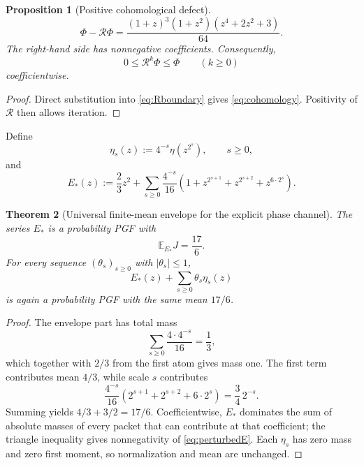 \documentclass[11pt,a4paper]{article}
\newtheorem{theorem}{Theorem}[section]
\newtheorem{proposition}[theorem]{Proposition}
\theoremstyle{definition}
\theoremstyle{remark}
\newcommand{\E}{\mathbb E}
\newcommand{\cR}{\mathcal R}
\begin{document}
\begin{proposition}[Positive cohomological defect]
\begin{equation}
 \boxed{
 \Phi-\cR\Phi
 =\frac{(1+z)^3(1+z^2)(z^4+2z^2+3)}{64}.
 }
 \label{eq:cohomology}
\end{equation}
The right-hand side has nonnegative coefficients.  Consequently,
\begin{equation}
 0\le\cR^k\Phi\le\Phi
 \qquad(k\ge0)
 \label{eq:Rbound}
\end{equation}
coefficientwise.
\end{proposition}

\begin{proof}
Direct substitution into \eqref{eq:Rboundary} gives
\eqref{eq:cohomology}.  Positivity of \(\cR\) then allows iteration.
\end{proof}

Define
\[
 \eta_s(z):=4^{-s}\eta(z^{2^s}),
 \qquad s\ge0,
\]
and
\begin{equation}
 \boxed{
 E_*(z):=\frac23z^2+
 \sum_{s\ge0}\frac{4^{-s}}{16}
 \left(1+z^{2^{s+1}}+z^{2^{s+2}}+z^{6\cdot2^s}\right).
 }
 \label{eq:envelope}
\end{equation}

\begin{theorem}[Universal finite-mean envelope for the explicit phase channel]
\label{thm:envelope}
The series \(E_*\) is a probability PGF with
\begin{equation}
 \boxed{\E_{E_*}J=\frac{17}{6}.}
 \label{eq:17over6}
\end{equation}
For every sequence \((\theta_s)_{s\ge0}\) with \(|\theta_s|\le1\),
\begin{equation}
 E_*(z)+\sum_{s\ge0}\theta_s\eta_s(z)
 \label{eq:perturbedE}
\end{equation}
is again a probability PGF with the same mean \(17/6\).
\end{theorem}

\begin{proof}
The envelope part has total mass
\[
 \sum_{s\ge0}\frac{4\cdot4^{-s}}{16}=\frac13,
\]
which together with \(2/3\) from the first atom gives mass one.  The first
term contributes mean \(4/3\), while scale \(s\) contributes
\[
 \frac{4^{-s}}{16}
 \left(2^{s+1}+2^{s+2}+6\cdot2^s\right)=\frac34\,2^{-s}.
\]
Summing yields \(4/3+3/2=17/6\).  Coefficientwise, \(E_*\) dominates the
sum of absolute masses of every packet that can contribute at that
coefficient; the triangle inequality gives nonnegativity of
\eqref{eq:perturbedE}.  Each \(\eta_s\) has zero mass and zero first moment,
so normalization and mean are unchanged.
\end{proof}
\end{document}
